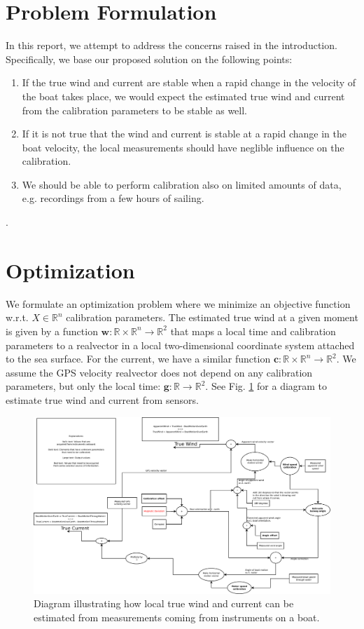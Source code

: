 \documentclass{article}
\newcommand{\realvec}[1]{\mathbf{#1}}
\newcommand{\realnumber}{\mathbb{R}}
\begin{document}
\section{Problem Formulation}
In this report, we attempt to address the concerns raised in the introduction. Specifically, we base our proposed solution on the following points:
\begin{enumerate}
 \item If the true wind and current are stable when a rapid change in the velocity of the boat takes place, we would expect the estimated true wind and current from the calibration parameters to be stable as well.
 \item If it is not true that the wind and current is stable at a rapid change in the boat velocity, the local measurements should have neglible influence on the calibration.
 \item We should be able to perform calibration also on limited amounts of data, e.g. recordings from a few hours of sailing.
\end{enumerate}.

\section{Optimization}
We formulate an optimization problem where we minimize an objective function w.r.t. $X \in \realnumber^n$ calibration parameters. The estimated true wind at a given moment is given by a function $\realvec{w}: \realnumber \times \realnumber^n \rightarrow \realnumber^2$ that maps a local time and calibration parameters to a realvector in a local two-dimensional coordinate system attached to the sea surface. For the current, we have a similar function $\realvec{c}: \realnumber \times \realnumber^n \rightarrow \realnumber^2$. We assume the GPS velocity realvector does not depend on any calibration parameters, but only the local time: $\realvec{g}: \realnumber \rightarrow \realnumber^2$. See Fig. \ref{fig:calib} for a diagram to estimate true wind and current from sensors.
\begin{figure}
\centering
\includegraphics[width=\textwidth]{simplecalib.pdf}
\caption{Diagram illustrating how local true wind and current can be estimated from measurements coming from instruments on a boat.}
\label{fig:calib}
\end{figure}
\end{document}
